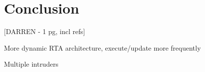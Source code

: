 \section{Conclusion}

[DARREN - 1 pg, incl refs]

More dynamic RTA architecture, execute/update more frequently

Multiple intruders


